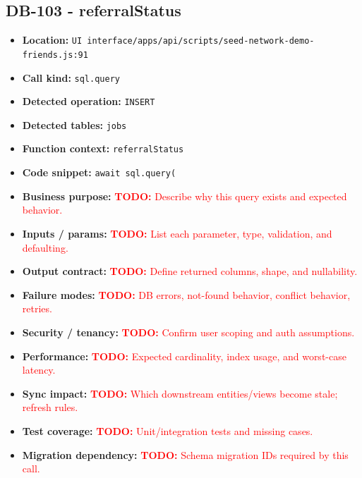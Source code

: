 \documentclass[11pt]{article}
\newcommand{\todoitem}[1]{\textcolor{red}{\textbf{TODO:} #1}}
\begin{document}
\subsection{DB-103 - referralStatus}
\begin{itemize}[leftmargin=1.5em]
\item \textbf{Location:} \texttt{UI interface/apps/api/scripts/seed-network-demo-friends.js:91}
\item \textbf{Call kind:} \texttt{sql.query}
\item \textbf{Detected operation:} \texttt{INSERT}
\item \textbf{Detected tables:} \texttt{jobs}
\item \textbf{Function context:} \texttt{referralStatus}
\item \textbf{Code snippet:} \texttt{await sql.query(}
\item \textbf{Business purpose:} \todoitem{Describe why this query exists and expected behavior.}
\item \textbf{Inputs / params:} \todoitem{List each parameter, type, validation, and defaulting.}
\item \textbf{Output contract:} \todoitem{Define returned columns, shape, and nullability.}
\item \textbf{Failure modes:} \todoitem{DB errors, not-found behavior, conflict behavior, retries.}
\item \textbf{Security / tenancy:} \todoitem{Confirm user scoping and auth assumptions.}
\item \textbf{Performance:} \todoitem{Expected cardinality, index usage, and worst-case latency.}
\item \textbf{Sync impact:} \todoitem{Which downstream entities/views become stale; refresh rules.}
\item \textbf{Test coverage:} \todoitem{Unit/integration tests and missing cases.}
\item \textbf{Migration dependency:} \todoitem{Schema migration IDs required by this call.}
\end{itemize}
\end{document}

